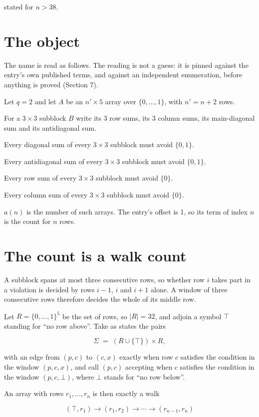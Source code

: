 \documentclass[11pt]{article}
\theoremstyle{definition}
\begin{document}
stated for $n > 38$.

\section{The object}

The name is read as follows. The reading is not a guess: it is pinned against the entry's own published terms, and against an independent enumeration, before anything is proved (Section 7).

Let $q = 2$ and let $A$ be an $n' \times 5$ array over $\{0,\dots,1\}$, with $n' = n + 2$ rows.

For a $3\times3$ subblock $B$ write its 3 row sums, its 3 column sums, its main-diagonal sum and its antidiagonal sum.

Every diagonal sum of every $3\times3$ subblock must avoid $\{0, 1\}$.

Every antidiagonal sum of every $3\times3$ subblock must avoid $\{0, 1\}$.

Every row sum of every $3\times3$ subblock must avoid $\{0\}$.

Every column sum of every $3\times3$ subblock must avoid $\{0\}$.

$a(n)$ is the number of such arrays. The entry's offset is 1, so its term of index $n$ is the count for $n$ rows.

\section{The count is a walk count}

A subblock spans at most three consecutive rows, so whether row $i$ takes part in a violation is decided by rows $i-1$, $i$ and $i+1$ alone. A window of three consecutive rows therefore decides the whole of its middle row.

Let $R = \{0,\dots,1\}^{5}$ be the set of rows, so $|R| = 32$, and adjoin a symbol $\top$ standing for ``no row above''. Take as states the pairs

\[\Sigma \;=\; (R \cup \{\top\}) \times R,\]

with an edge from $(p,c)$ to $(c,x)$ exactly when row $c$ satisfies the condition in the window $(p,c,x)$, and call $(p,c)$ accepting when $c$ satisfies the condition in the window $(p,c,\bot)$, where $\bot$ stands for ``no row below''.

An array with rows $r_1,\dots,r_n$ is then exactly a walk

\[(\top,r_1) \to (r_1,r_2) \to \cdots \to (r_{n-1},r_n)\]
\end{document}
